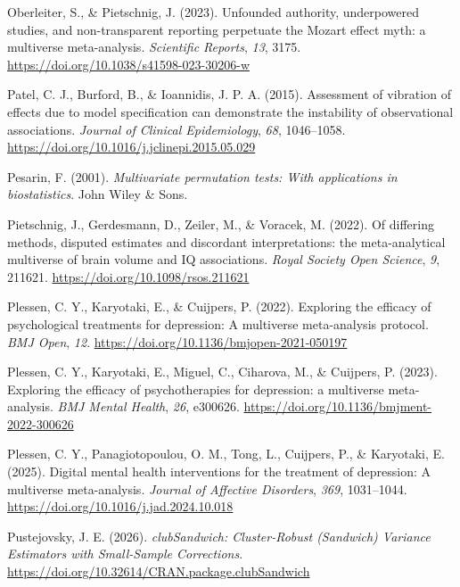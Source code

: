 \documentclass[
  man,
  longtable,
  nolmodern,
  notxfonts,
  notimes,
  colorlinks=true,linkcolor=blue,citecolor=blue,urlcolor=blue]{apa7}
\newlength{\cslhangindent}
\newenvironment{CSLReferences}[2] %
 {\begin{list}{}{%
  \setlength{\itemindent}{0pt}
  \setlength{\leftmargin}{0pt}
  \setlength{\parsep}{0pt}
  \ifodd #1
   \setlength{\leftmargin}{\cslhangindent}
   \setlength{\itemindent}{-1\cslhangindent}
  \fi
  \setlength{\itemsep}{#2\baselineskip}}}
 {\end{list}}
\begin{document}
\begin{CSLReferences}{1}{0}
Oberleiter, S., \& Pietschnig, J. (2023). {Unfounded authority,
underpowered studies, and non-transparent reporting perpetuate the
Mozart effect myth: a multiverse meta-analysis}. \emph{Scientific
Reports}, \emph{13}, 3175.
\url{https://doi.org/10.1038/s41598-023-30206-w}

Patel, C. J., Burford, B., \& Ioannidis, J. P. A. (2015). {Assessment of
vibration of effects due to model specification can demonstrate the
instability of observational associations}. \emph{Journal of Clinical
Epidemiology}, \emph{68}, 1046--1058.
\url{https://doi.org/10.1016/j.jclinepi.2015.05.029}

Pesarin, F. (2001). \emph{Multivariate permutation tests: With
applications in biostatistics}. John Wiley \& Sons.

Pietschnig, J., Gerdesmann, D., Zeiler, M., \& Voracek, M. (2022). {Of
differing methods, disputed estimates and discordant interpretations:
the meta-analytical multiverse of brain volume and IQ associations}.
\emph{Royal Society Open Science}, \emph{9}, 211621.
\url{https://doi.org/10.1098/rsos.211621}

Plessen, C. Y., Karyotaki, E., \& Cuijpers, P. (2022). {Exploring the
efficacy of psychological treatments for depression: A multiverse
meta-analysis protocol}. \emph{BMJ Open}, \emph{12}.
\url{https://doi.org/10.1136/bmjopen-2021-050197}

Plessen, C. Y., Karyotaki, E., Miguel, C., Ciharova, M., \& Cuijpers, P.
(2023). {Exploring the efficacy of psychotherapies for depression: a
multiverse meta-analysis}. \emph{BMJ Mental Health}, \emph{26}, e300626.
\url{https://doi.org/10.1136/bmjment-2022-300626}

Plessen, C. Y., Panagiotopoulou, O. M., Tong, L., Cuijpers, P., \&
Karyotaki, E. (2025). {Digital mental health interventions for the
treatment of depression: A multiverse meta-analysis}. \emph{Journal of
Affective Disorders}, \emph{369}, 1031--1044.
\url{https://doi.org/10.1016/j.jad.2024.10.018}

Pustejovsky, J. E. (2026). \emph{{clubSandwich: Cluster-Robust
(Sandwich) Variance Estimators with Small-Sample Corrections}}.
\url{https://doi.org/10.32614/CRAN.package.clubSandwich}


\end{CSLReferences}
\end{document}
